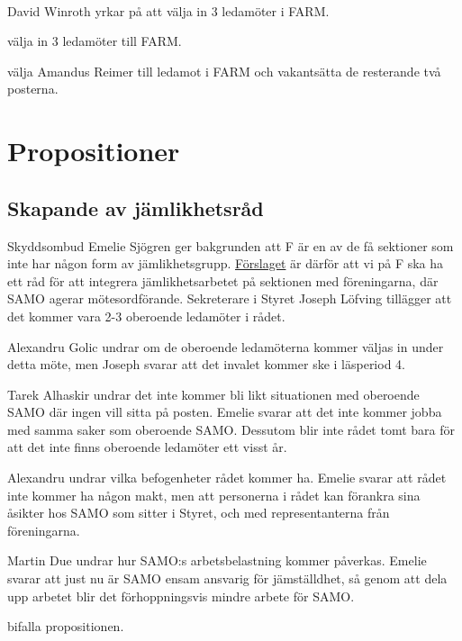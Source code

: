 \documentclass[hidelinks]{sektionsmote}
\begin{document}
\paragraph{}
David Winroth yrkar på att välja in 3 ledamöter i FARM.

\begin{beslut}
  \item välja in 3 ledamöter till FARM.
  \item välja Amandus Reimer till ledamot i FARM och vakantsätta de resterande två posterna.
\end{beslut}


\section{Propositioner}
\subsection{Skapande av jämlikhetsråd}
Skyddsombud Emelie Sjögren ger bakgrunden att F är en av de få sektioner som inte har någon form av jämlikhetsgrupp.
\hyperlink{bilagor/propjaemf.pdf.1}{Förslaget} är därför att vi på F ska ha ett råd för att integrera jämlikhetsarbetet på sektionen med föreningarna, där SAMO agerar mötesordförande.
Sekreterare i Styret Joseph Löfving tillägger att det kommer vara 2-3 oberoende ledamöter i rådet.\par
Alexandru Golic undrar om de oberoende ledamöterna kommer väljas in under detta möte, men Joseph svarar att det invalet kommer ske i läsperiod 4.\par
Tarek Alhaskir undrar det inte kommer bli likt situationen med oberoende SAMO där ingen vill sitta på posten.
Emelie svarar att det inte kommer jobba med samma saker som oberoende SAMO.
Dessutom blir inte rådet tomt bara för att det inte finns oberoende ledamöter ett visst år.\par
Alexandru undrar vilka befogenheter rådet kommer ha.
Emelie svarar att rådet inte kommer ha någon makt, men att personerna i rådet kan förankra sina åsikter hos SAMO som sitter i Styret, och med representanterna från föreningarna.\par
Martin Due undrar hur SAMO:s arbetsbelastning kommer påverkas.
Emelie svarar att just nu är SAMO ensam ansvarig för jämställdhet, så genom att dela upp arbetet blir det förhoppningsvis mindre arbete för SAMO.

\begin{beslut}
  \item bifalla propositionen.
\end{beslut}
\end{document}
